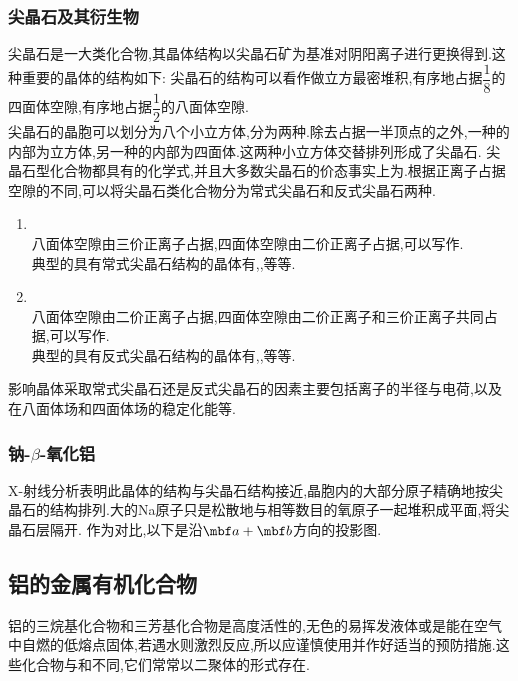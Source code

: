 \documentclass{ctexart}
\begin{document}
\subsubsection{尖晶石及其衍生物}
尖晶石是一大类化合物,其晶体结构以尖晶石矿为基准对阴阳离子进行更换得到.这种重要的晶体的结构如下:
尖晶石的结构可以看作做立方最密堆积,有序地占据$\dfrac18$的四面体空隙,有序地占据$\dfrac12$的八面体空隙.\\
\indent 尖晶石的晶胞可以划分为八个小立方体,分为两种.除去占据一半顶点的之外,一种的内部为立方体,另一种的内部为四面体.这两种小立方体交替排列形成了尖晶石.
尖晶石型化合物都具有的化学式,并且大多数尖晶石的价态事实上为.根据正离子占据空隙的不同,可以将尖晶石类化合物分为常式尖晶石和反式尖晶石两种.
\begin{enumerate}[label=\tbf{\arabic*.},topsep=0pt,parsep=0pt,itemsep=0pt,partopsep=0pt]
    \item {}\\
        八面体空隙由三价正离子占据,四面体空隙由二价正离子占据,可以写作.\\
        典型的具有常式尖晶石结构的晶体有,,等等.
    \item {}\\
        八面体空隙由二价正离子占据,四面体空隙由二价正离子和三价正离子共同占据,可以写作.\\
        典型的具有反式尖晶石结构的晶体有,,等等.
\end{enumerate}
\indent 影响晶体采取常式尖晶石还是反式尖晶石的因素主要包括离子的半径与电荷,以及在八面体场和四面体场的稳定化能等.
\subsubsection{钠-$\beta$-氧化铝}
X-射线分析表明此晶体的结构与尖晶石结构接近,晶胞内的大部分原子精确地按尖晶石的结构排列.大的Na原子只是松散地与相等数目的氧原子一起堆积成平面,将尖晶石层隔开.
作为对比,以下是沿$\mbf a+\mbf b$方向的投影图.
\subsection{铝的金属有机化合物}
铝的三烷基化合物和三芳基化合物是高度活性的,无色的易挥发液体或是能在空气中自燃的低熔点固体,若遇水则激烈反应,所以应谨慎使用并作好适当的预防措施.这些化合物与和不同,它们常常以二聚体的形式存在.
\end{document}
